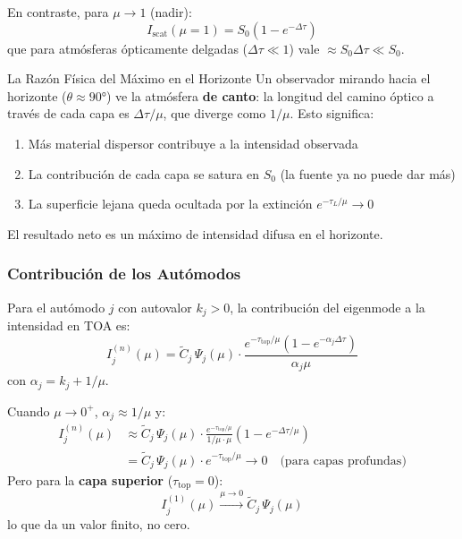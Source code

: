 \documentclass[a4paper,11pt]{article}
\begin{document}
En contraste, para $\mu \to 1$ (nadir):
\begin{equation}
I_{\text{scat}}(\mu=1) = S_0 (1 - e^{-\Delta\tau})
\end{equation}
que para atm\'osferas \'opticamente delgadas ($\Delta\tau \ll 1$) vale $\approx S_0 \Delta\tau \ll S_0$.

\begin{concept}{La Raz\'on F\'isica del M\'aximo en el Horizonte}
Un observador mirando hacia el horizonte ($\theta \approx 90°$) ve la atm\'osfera \textbf{de canto}: la longitud del camino \'optico a trav\'es de cada capa es $\Delta\tau / \mu$, que diverge como $1/\mu$.  Esto significa:
\begin{enumerate}
\item M\'as material dispersor contribuye a la intensidad observada
\item La contribuci\'on de cada capa se satura en $S_0$ (la fuente ya no puede dar m\'as)
\item La superficie lejana queda ocultada por la extinci\'on $e^{-\tau_L/\mu} \to 0$
\end{enumerate}
El resultado neto es un m\'aximo de intensidad difusa en el horizonte.
\end{concept}

\subsubsection{Contribuci\'on de los Autómodos}

Para el autómodo $j$ con autovalor $k_j > 0$, la contribuci\'on del eigenmode a la intensidad en TOA es:
\begin{equation}
I_j^{(n)}(\mu) = \widetilde{C}_j \, \Psi_j(\mu) \cdot \frac{e^{-\tau_{\text{top}}/\mu} (1 - e^{-\alpha_j \Delta\tau})}{\alpha_j \mu}
\end{equation}
con $\alpha_j = k_j + 1/\mu$.

Cuando $\mu \to 0^+$, $\alpha_j \approx 1/\mu$ y:
\begin{align}
I_j^{(n)}(\mu) &\approx \widetilde{C}_j \, \Psi_j(\mu) \cdot \frac{e^{-\tau_{\text{top}}/\mu}}{1/\mu \cdot \mu} \left(1 - e^{-\Delta\tau/\mu}\right) \\
&= \widetilde{C}_j \, \Psi_j(\mu) \cdot e^{-\tau_{\text{top}}/\mu} \to 0 \quad \text{(para capas profundas)}
\end{align}
Pero para la \textbf{capa superior} ($\tau_{\text{top}} = 0$):
\begin{equation}
I_j^{(1)}(\mu) \xrightarrow{\mu \to 0} \widetilde{C}_j \, \Psi_j(\mu)
\end{equation}
lo que da un valor finito, no cero.
\end{document}

